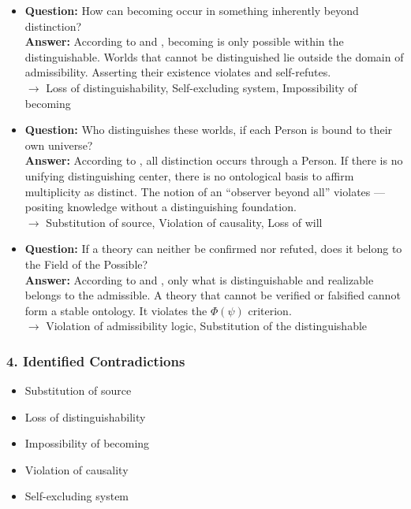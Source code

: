 \documentclass[12pt]{article}
\begin{document}
\begin{itemize}
\item \textbf{Question:} How can becoming occur in something inherently beyond distinction?\\
\textbf{Answer:} According to \text{[4.1]} and \text{[11.1.1.4]}, becoming is only possible within the distinguishable. Worlds that cannot be distinguished lie outside the domain of admissibility. Asserting their existence violates \text{[9.1]} and self-refutes.\\
$\rightarrow$ Loss of distinguishability, Self-excluding system, Impossibility of becoming

\item \textbf{Question:} Who distinguishes these worlds, if each Person is bound to their own universe?\\
\textbf{Answer:} According to \text{[10.4]}, all distinction occurs through a Person. If there is no unifying distinguishing center, there is no ontological basis to affirm multiplicity as distinct. The notion of an ``observer beyond all'' violates \text{[1]} — positing knowledge without a distinguishing foundation.\\
$\rightarrow$ Substitution of source, Violation of causality, Loss of will

\item \textbf{Question:} If a theory can neither be confirmed nor refuted, does it belong to the Field of the Possible?\\
\textbf{Answer:} According to \text{[3]} and \text{[11.1.1.4]}, only what is distinguishable and realizable belongs to the admissible. A theory that cannot be verified or falsified cannot form a stable ontology. It violates the $\Phi(\psi)$ criterion.\\
$\rightarrow$ Violation of admissibility logic, Substitution of the distinguishable
\end{itemize}

\subsubsection*{4. Identified Contradictions}

\begin{itemize}
\item Substitution of source
\item Loss of distinguishability
\item Impossibility of becoming
\item Violation of causality
\item Self-excluding system
\end{itemize}
\end{document}
